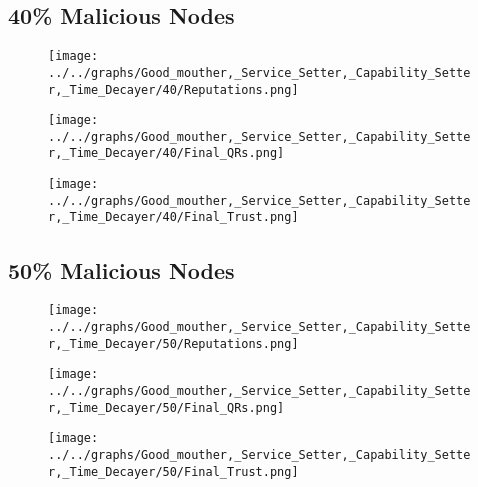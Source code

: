 \begin{minipage}[t]{0.49\columnwidth}
\subsection*{40\% Malicious Nodes}
    \begin{figure}[H]
        \centering
        \texttt{[image: ../../graphs/Good\_mouther,\_Service\_Setter,\_Capability\_Setter,\_Time\_Decayer/40/Reputations.png]}
    \end{figure}
    \begin{figure}[H]
        \centering
        \texttt{[image: ../../graphs/Good\_mouther,\_Service\_Setter,\_Capability\_Setter,\_Time\_Decayer/40/Final\_QRs.png]}
    \end{figure}
\end{minipage}
\begin{minipage}[t]{0.49\columnwidth}
    \begin{figure}[H]
        \centering
        \texttt{[image: ../../graphs/Good\_mouther,\_Service\_Setter,\_Capability\_Setter,\_Time\_Decayer/40/Final\_Trust.png]}
    \end{figure}
\end{minipage}

\begin{minipage}[t]{0.49\columnwidth}
\subsection*{50\% Malicious Nodes}
    \begin{figure}[H]
        \centering
        \texttt{[image: ../../graphs/Good\_mouther,\_Service\_Setter,\_Capability\_Setter,\_Time\_Decayer/50/Reputations.png]}
    \end{figure}
    \begin{figure}[H]
        \centering
        \texttt{[image: ../../graphs/Good\_mouther,\_Service\_Setter,\_Capability\_Setter,\_Time\_Decayer/50/Final\_QRs.png]}
    \end{figure}
\end{minipage}
\begin{minipage}[t]{0.49\columnwidth}
    \begin{figure}[H]
        \centering
        \texttt{[image: ../../graphs/Good\_mouther,\_Service\_Setter,\_Capability\_Setter,\_Time\_Decayer/50/Final\_Trust.png]}
    \end{figure}
\end{minipage}

